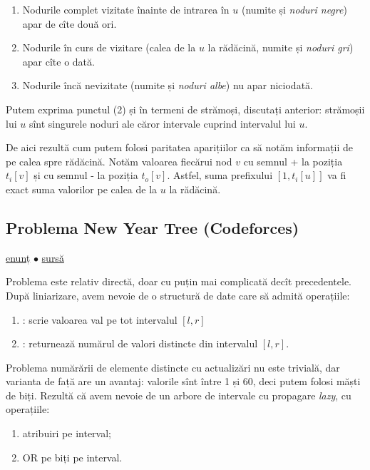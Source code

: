 \documentclass[../main.tex]{subfiles}
\begin{document}
\begin{enumerate}
  \item Nodurile complet vizitate înainte de intrarea în $u$ (numite și \textit{noduri negre}) apar de cîte două ori.
  \item Nodurile în curs de vizitare (calea de la $u$ la rădăcină, numite și \textit{noduri gri}) apar cîte o dată.
  \item Nodurile încă nevizitate (numite și \textit{noduri albe}) nu apar niciodată.
\end{enumerate}

Putem exprima punctul (2) și în termeni de strămoși, discutați anterior: strămoșii lui $u$ sînt singurele noduri ale căror intervale cuprind intervalul lui $u$.

De aici rezultă cum putem folosi paritatea aparițiilor ca să notăm informații de pe calea spre rădăcină. Notăm valoarea fiecărui nod $v$ cu semnul + la poziția $t_i[v]$ și cu semnul - la poziția $t_o[v]$. Astfel, suma prefixului $[1, t_i[u]]$ va fi exact suma valorilor pe calea de la $u$ la rădăcină.

\subsection{Problema New Year Tree (Codeforces)}
\label{problem:new-year-tree}

\href{https://codeforces.com/contest/620/problem/E}{enunț}
$\bullet$
\hyperref[code:new-year-tree]{sursă}

Problema este relativ directă, doar cu puțin mai complicată decît precedentele. După liniarizare, avem nevoie de o structură de date care să admită operațiile:

\begin{enumerate}
  \item {}: scrie valoarea val pe tot intervalul $[l,r]$
  \item {}: returnează numărul de valori distincte din intervalul $[l,r]$.
\end{enumerate}

Problema numărării de elemente distincte cu actualizări nu este trivială, dar varianta de față are un avantaj: valorile sînt între 1 și 60, deci putem folosi măști de biți. Rezultă că avem nevoie de un arbore de intervale cu propagare \textit{lazy}, cu operațiile:

\begin{enumerate}
  \item atribuiri pe interval;
  \item OR pe biți pe interval.
\end{enumerate}
\end{document}
